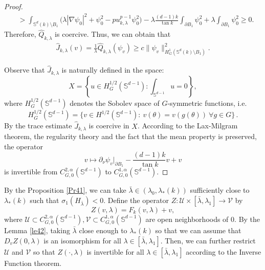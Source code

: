 \documentclass[reqno]{amsart}
\def\S{\mathbb S}
\numberwithin{equation}{section}
\newenvironment{key words}{\textbf{Keywords}\mbox{  }}{ }
\begin{document}
\begin{proof}
\begin{align*}
       &>\int_{\S^{d}(k)\setminus B_{1}}\big(\lambda|\nabla\psi_{0}|^{2}+\psi_{0}^{2}-pu_{k,\lambda}^{p-1}\psi_{0}^{2}\big)-\lambda\frac{(d-1)k}{\tan k}\int_{\partial B_{1}}\psi_{0}^{2}+\lambda \int_{\partial B_{1}}\psi_{0}^{2}\geq0.
\end{align*}
Therefore, $\hat{Q}_{k,\lambda}$ is coercive. Thus, we can obtain that
\begin{align*}\hat{J}_{k,\lambda} (v) =\frac{1}{\lambda}\hat{Q}_{k,\lambda}(\psi_{v})
\geq c\|\psi_{v}\|^{2}_{H^{1}_{G}(\S^{d}(k)\setminus B_{1})}. %
\end{align*}

Observe that $\hat{J}_{k,\lambda}$ is naturally defined in the space: $$X= \left\{u \in H_G^{1/2}(\S^{ d-1}): \int_{\S^{ d-1}} u =0\right\},$$ where $H_G^{1/2}(\S^{ d-1})$ denotes the Sobolev space of $G$-symmetric functions, i.e.
\[
  H^{1/2}_{G}(\S^{ d-1})=\{v\in H^{1/2}(\S^{ d-1}): \ v(\theta)=v(g(\theta)) \ \forall g\in G\}\,.
\]
By the trace estimate $\hat{J}_{k,\lambda}$ is coercive in $X$. According to the Lax-Milgram theorem, the regularity theory and the fact that the mean property is preserved, the operator
 \[v\mapsto \partial_{\nu}\psi_{v}\big|_{\partial B_{1}}-\frac{(d-1)k}{\tan k}v +  v\]
 is invertible from $C^{2,\alpha}_{G,0}(\S ^{d-1})$ to $C^{1,\alpha}_{G,0}(\S ^{d-1})$.
   \end{proof}

     By the Proposition \ref{Pr41}, we can take $ \bar{\lambda}\in(\lambda_{0},\lambda_{*}(k))$ sufficiently close to $\lambda_{*}(k)$ such that $\sigma_{1}(H_{\bar{\lambda}})<0.$ Define the operator $Z:\mathcal{U} \times [\bar{\lambda},\lambda_{1}] \to \mathcal{V}$ by
   \begin{equation*}
    Z(v,\lambda)=F_k(v,\lambda)+v,
   \end{equation*}
  where $\mathcal{U}\subset C^{2,\alpha}_{G,0}(\S ^{d-1}),\mathcal{V}\subset C^{1,\alpha}_{G,0}(\S ^{d-1})$ are open neighborhoods of $0$. By the Lemma \ref{le42}, taking $\bar{\lambda}$ close enough to $\lambda_{*}(k)$ so that we can assume that $D_{v}Z(0,\lambda)$ is an isomorphism for all $\lambda\in[\bar{\lambda},\lambda_{1}].$ Then, we can further restrict $\mathcal{U}$ and $\mathcal{V}$ so that $Z(\cdot,\lambda)$ is invertible for all $\lambda\in[\bar{\lambda},\lambda_{1}]$ according to the Inverse Function theorem.
\end{document}
